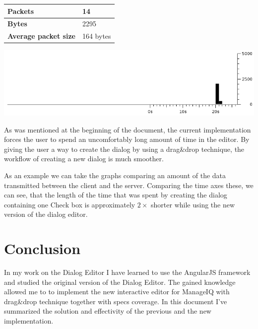 \vspace{\baselineskip}
\noindent\begin{minipage}{\linewidth}
  \centering
  \begin{tabular}{|l|l|}
    \hline
    {\bf Packets}             & 14        \\ \hline
    {\bf Bytes}               & 2295      \\ \hline
    {\bf Average packet size} & 164 bytes \\ \hline
  \end{tabular}
  \label{tab:1-ssui-add-new-checkbox-memcached}
  \includegraphics[width=15cm,keepaspectratio]{fig/1-ssui-add-new-checkbox-memcached}
  \label{fig:1-ssui-add-new-checkbox-memcached}
\end{minipage}
\vspace{\baselineskip}

As was mentioned at the beginning of the document, the current
implementation forces the user to spend an uncomfortably long amount of time in
the editor. By giving the user a way to create the dialog by using a drag\&drop
technique, the workflow of creating a new dialog is much smoother.

As an example we can take the graphs comparing an amount of the data
transmitted between the client and the server.
Comparing the time axes these, we can see, that the length of the time that was
spent by creating the dialog containing one Check box is approximately
$2\times$ shorter while using the new version of the dialog editor.

\chapter{Conclusion}\label{ch:conclusion}

In my work on the Dialog Editor I have learned to use the AngularJS framework
and studied the original version of the Dialog Editor.
The gained knowledge allowed me to to implement the new interactive editor for
ManageIQ with drag\&drop technique together with specs coverage.
In this document I've summarized the solution and effectivity of the previous
and the new implementation.

